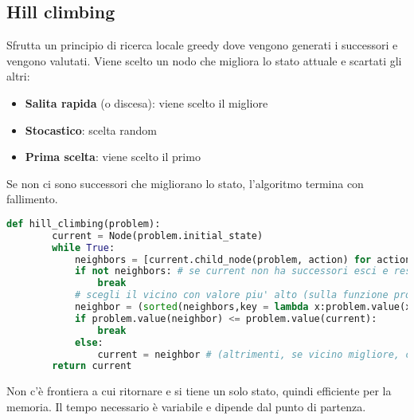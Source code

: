 \subsection{Hill climbing}
\label{alg:hill_climbing}
Sfrutta un principio di ricerca locale greedy dove vengono generati i successori e vengono valutati. Viene scelto un nodo che migliora lo stato attuale e scartati gli altri:
\begin{itemize}
	\item \textbf{Salita rapida} (o discesa): viene scelto il migliore
	\item \textbf{Stocastico}: scelta random
	\item \textbf{Prima scelta}: viene scelto il primo 
\end{itemize}
Se non ci sono successori che migliorano lo stato, l'algoritmo termina con fallimento.
\begin{lstlisting}[language=Python]
	def hill_climbing(problem):
		current = Node(problem.initial_state)
		while True:
			neighbors = [current.child_node(problem, action) for action in problem.actions(current.state)]
			if not neighbors: # se current non ha successori esci e restituisci current
				break
			# scegli il vicino con valore piu' alto (sulla funzione problem.value)
			neighbor = (sorted(neighbors,key = lambda x:problem.value(x), reverse = True))[0]
			if problem.value(neighbor) <= problem.value(current):
				break
			else:
				current = neighbor # (altrimenti, se vicino migliore, continua)
		return current
\end{lstlisting}
Non c'è frontiera a cui ritornare e si tiene un solo stato, quindi efficiente per la memoria. Il tempo necessario è variabile e dipende dal punto di partenza.\\

